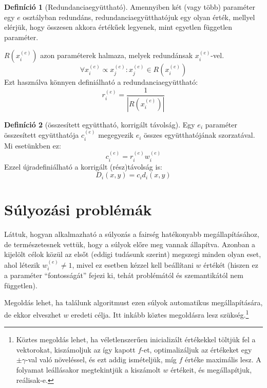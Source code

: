 \documentclass[twocolumn]{article}
\theoremstyle{definition}
\newtheorem{definition}{Definíció}[section]
\newcommand{\ent}[2]{ {#1}^{(#2)} }
\begin{document}
    \begin{definition}[Redundanciaegyüttható]
        Amennyiben két (vagy több) paraméter egy $e$ osztályban redundáns, redundanciaegyütthatójuk egy olyan érték, mellyel elérjük, hogy összesen akkora értékűek legyenek, mint egyetlen független paraméter.
        
        $R(\ent x e _i)$ azon paraméterek halmaza, melyek redundánsak $\ent x e _i$-vel.
        \begin{equation}
            \forall \ent x e _i \propto \ent x e _j : \ent x e _j \in R(\ent x e _i) 
        \end{equation}
        Ezt használva könnyen definiálható a redundanciaegyüttható:
        \begin{equation}
            \ent r e _i = \frac{1}{|R(\ent x e _i)|}
        \end{equation}
    \end{definition}
    
    \begin{definition}[összesített együttható, korrigált távolság]
        Egy $e_i$ paraméter összesített együtthatója $\ent c e _i$ megegyezik $e_i$ összes együtthatójának szorzatával. Mi esetünkben ez:
        \begin{equation}
            \ent c e _i = \ent r e _i \ent w e _i
        \end{equation}
        Ezzel újradefiniálható a korrigált (rész)távolság is:
        \begin{equation}
            D_i(x, y) = c_i d_i(x, y)
        \end{equation}
    \end{definition}

\section{Súlyozási problémák}
    Láttuk, hogyan alkalmazható a súlyozás a fairség hatékonyabb megállapításához, de természetesnek vettük, hogy a súlyok előre meg vannak állapítva. Azonban a kijelölt célok közül az elsőt (eddigi tudásunk szerint) megszegi minden olyan eset, ahol létezik $\ent w e _i \neq 1$, mivel ez esetben kézzel kell beállítani $w$ értékét (hiszen ez a paraméter \enquote{fontosságát} fejezi ki, tehát problémától és szemantikától nem független).
    
    Megoldás lehet, ha találunk algoritmust ezen súlyok automatikus megállapítására, de ekkor elveszhet $w$ eredeti célja. Itt inkább köztes megoldásra lesz szükség.\footnote{Köztes megoldás lehet, ha véletlenszerűen inicializált értékekkel töltjük fel a vektorokat, kiszámoljuk az így kapott $f$-et, optimalizáljuk az értékeket egy $\pm \gamma$-val való növeléssel, és ezt addig ismételjük, míg $f$ értéke maximális lesz. A folyamat leállásakor megtekintjük a kiszámolt $w$ értékeit, és megállapítjuk, reálisak-e.}
    
\end{document}
